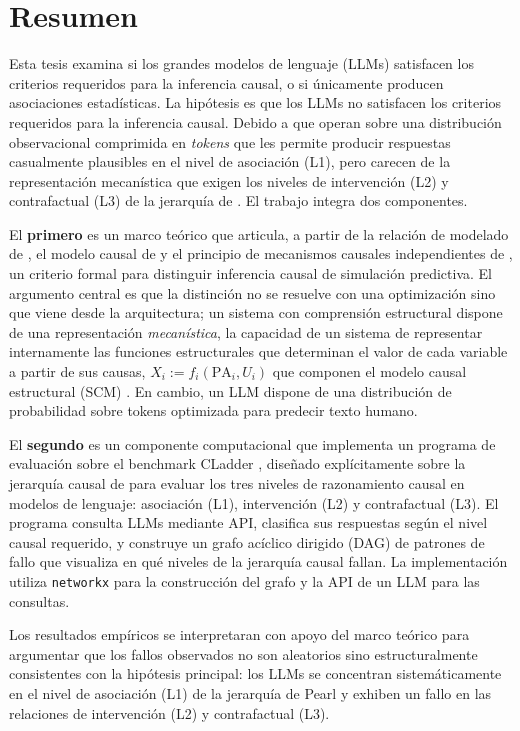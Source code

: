 \section{Resumen}

Esta tesis examina si los grandes modelos de lenguaje (LLMs) satisfacen 
los criterios requeridos para la inferencia causal, o si únicamente producen asociaciones estadísticas. 
La hipótesis es que los LLMs no satisfacen los criterios requeridos para la inferencia causal. 
Debido a que operan sobre una distribución observacional comprimida en \textit{tokens} que les 
permite producir respuestas casualmente plausibles en el nivel de 
asociación (L1), pero carecen de la representación mecanística que 
exigen los niveles de intervención (L2) y contrafactual (L3) de la 
jerarquía de \textcite{pearl2009causality}. El trabajo integra dos componentes.

El \textbf{primero} es un marco teórico que articula, a partir de la relación de 
modelado de \textcite{rosen2012anticipatory}, el modelo causal de 
\textcite{pearl2009causality} y el principio de mecanismos causales 
independientes de \textcite{scholkopf2021toward}, un criterio formal para 
distinguir inferencia causal de simulación predictiva. El argumento 
central es que la distinción no se resuelve con una optimización sino que viene 
desde la arquitectura; un sistema con comprensión estructural dispone de una representación  
\textit{mecanística}, la capacidad de un sistema de representar internamente 
las funciones estructurales que determinan el valor de cada variable 
a partir de sus causas,  $X_i := f_i(\text{PA}_i, U_i)$ que componen el modelo causal estructural (SCM) \parencite{pearl2000causality}. 
En cambio, un LLM dispone de una distribución de probabilidad sobre tokens optimizada para predecir texto 
humano.

El \textbf{segundo} es un componente computacional que implementa un programa de 
evaluación sobre el benchmark CLadder \parencite{jin2023cladder}, diseñado 
explícitamente sobre la jerarquía causal de \textcite{pearl2009causality} 
para evaluar los tres niveles de razonamiento causal en modelos de lenguaje: asociación (L1), 
intervención (L2) y contrafactual (L3). El programa consulta LLMs mediante 
API, clasifica sus respuestas según el nivel causal requerido, y construye 
un grafo acíclico dirigido (DAG) de patrones de fallo que visualiza en qué 
niveles de la jerarquía causal fallan.  
La implementación utiliza \texttt{networkx} para la construcción del grafo 
y la API de un LLM  para las consultas. 

Los resultados empíricos se interpretaran con apoyo del marco teórico para 
argumentar que los fallos observados no son aleatorios sino estructuralmente 
consistentes con la hipótesis principal: los LLMs se concentran 
sistemáticamente en el nivel de asociación (L1) de la jerarquía de Pearl y exhiben 
un fallo en las relaciones de intervención (L2) y contrafactual (L3). 